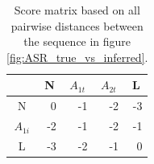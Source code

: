 \begin{table}[ht!]
\centering
\begin{tabular}{c|r|r|r|r}
\rowcolor[HTML]{EFEFEF}
                                 & \multicolumn{1}{c|}{\cellcolor[HTML]{EFEFEF}N} & \multicolumn{1}{c|}{\cellcolor[HTML]{EFEFEF}$A_{1t}$} & \multicolumn{1}{c|}{\cellcolor[HTML]{EFEFEF}$A_{2t}$} & \multicolumn{1}{c}{\cellcolor[HTML]{EFEFEF}L} \\ \hline
\cellcolor[HTML]{EFEFEF}N        & 0                                              & -1                                                    & -2                                                    & \multicolumn{1}{r|}{-3}                       \\ \hline
\cellcolor[HTML]{EFEFEF}$A_{1i}$ & -2                                             & -1                                                     & -2                                                    & \multicolumn{1}{r|}{-1}                       \\ \hline
\cellcolor[HTML]{EFEFEF}L        & -3                                             & -2                                                    & -1                                                    & \multicolumn{1}{r|}{0}                        \\ \hline
\end{tabular}
    \caption{
         \label{distance_matrix}
             Score matrix based on all pairwise distances between the sequence in figure \ref{fig:ASR_true_vs_inferred}.
             }
\end{table}


